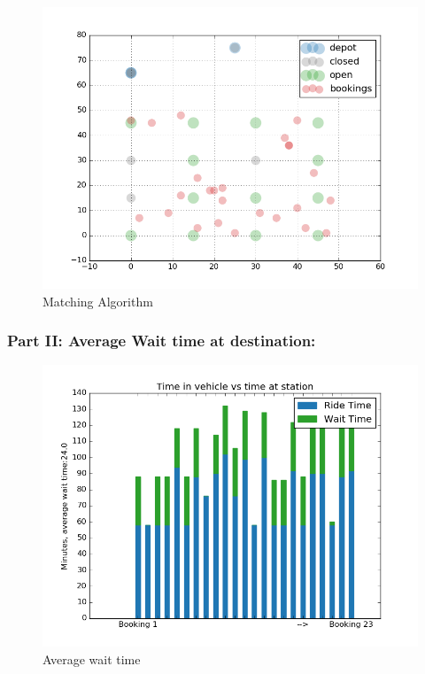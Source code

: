 \documentclass{article}
\begin{document}
\begin{figure}[H]
    \centering 
  \includegraphics[width=0.7\linewidth]{pictures/results/Example1_3}
  \caption{Matching Algorithm}
\label{fig:matching}
\end{figure}



\subsubsection*{Part II: Average Wait time at destination: }
\begin{figure}[H]
    \centering 
  \includegraphics[width=0.7\linewidth]{pictures/results/Example3_cb}
  \caption{Average wait time}
\label{fig:wts}
\end{figure}
\end{document}
